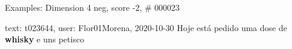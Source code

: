 \begin{frame}{Examples: Dimension 4 neg, score -2, \# 000023}
\footnotesize
\begin{alertblock}{text: t023644, user: Flor01Morena, 2020-10-30}
Hoje está pedido uma dose de \textbf{whisky} e uns petisco 
\textbf{} 
\end{alertblock}
\end{frame}

